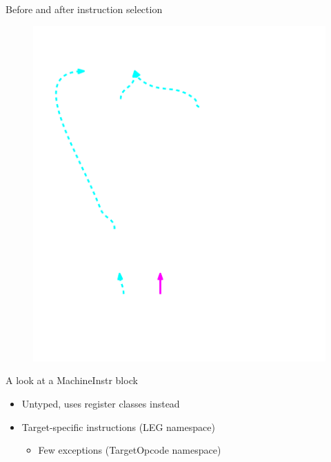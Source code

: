 \begin{frame}{Before and after instruction selection}
\begin{minipage}[t]{0.49\linewidth}
\begin{figure}
        \includegraphics[width = 1.00\textwidth]{examples/ex1b/ex1b-post-isel.pdf}
    \end{figure}
\end{minipage}


\end{frame}


\begin{frame}{A look at a MachineInstr block}

\begin{itemize}
    \item Untyped, uses register classes instead
    \item Target-specific instructions (LEG namespace)
    \begin{itemize}
        \item Few exceptions (TargetOpcode namespace)
    \end{itemize}
\end{itemize}



\end{frame}
